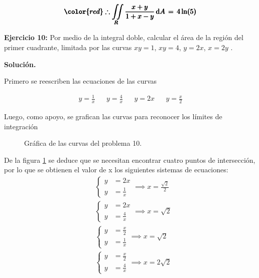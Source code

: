 \documentclass[12pt]{article}
\begin{document}
\begin{align*}
	\pmb{\color{red} \therefore \iint\limits_R \frac{x+y}{1+x-y}\, \mathrm{d}A\, = \,4\ln(5)}
\end{align*}

\noindent \textbf{Ejercicio 10:} Por medio de la integral doble, calcular el área de la 
región del primer cuadrante, limitada por las curvas $xy = 1$, $xy = 4$, $y = 2x$, $x = 2y$ .

\vspace{5mm}

\noindent \textbf{Solución.}

\vspace{3mm}
Primero se reescriben las ecuaciones de las curvas

\begin{align*}
	y = \frac{1}{x} && y = \frac{4}{x} && y = 2x && y = \frac{x}{2}
\end{align*}

Luego, como apoyo, se grafican las curvas para reconocer los límites de integración
\begin{figure}
\centering
{}
	\caption{Gráfica de las curvas del problema 10.}
	\label{ej10}
\end{figure}

De la figura \ref{ej10} se deduce que se necesitan encontrar cuatro puntos de intersección,
por lo que se obtienen el valor de x los siguientes sistemas de ecuaciones:
\begin{align*}
	&\begin{cases}
		y &= 2x \\
		y &= \frac{1}{x}
	\end{cases}	
	\implies x = \frac{\sqrt{2}}{2}	\\
	&\begin{cases}
		y &= 2x \\
		y &= \frac{4}{x}
	\end{cases}	
	\implies x = \sqrt{2} \\
	&\begin{cases}
		y &= \frac{x}{2} \\
		y &= \frac{1}{x}
	\end{cases}	
	\implies x = \sqrt{2} \\
	&\begin{cases}
		y &= \frac{x}{2} \\
		y &= \frac{4}{x}
	\end{cases}	
	\implies x = 2\sqrt{2} \\
\end{align*}
\end{document}
